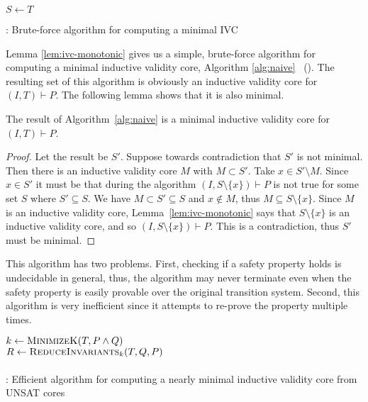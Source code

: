 

\begin{algorithm}[t]
  \BlankLine
  $S \leftarrow T$ \\
   {
  }
\caption{\bfalg: Brute-force algorithm for computing a minimal IVC}
\label{alg:naive}
\end{algorithm}

Lemma \ref{lem:ivc-monotonic} gives us a simple, brute-force algorithm for computing
a minimal inductive validity core, Algorithm \ref{alg:naive} ~(\bfalg). The
resulting set of this algorithm is obviously an inductive validity
core for $(I, T)\vdash P$. The following lemma shows that it is also
minimal.

\begin{lemma}
  The result of Algorithm~\ref{alg:naive} is a minimal inductive validity core
  for $(I, T)\vdash P$.
\end{lemma}
\begin{proof}
  Let the result be $S'$. Suppose towards contradiction that $S'$ is not
  minimal. Then there is an inductive validity core $M$ with $M
  \subset S'$. Take $x \in S'\setminus M$. Since $x \in S'$ it must be
  that during the algorithm $(I, S\setminus\{x\})\vdash P$ is not true
  for some set $S$ where $S' \subseteq S$. We have $M \subset S'
  \subseteq S$ and $x\not\in M$, thus $M \subseteq S\setminus \{x\}$.
  Since $M$ is an inductive validity core,
  Lemma~\ref{lem:ivc-monotonic} says that $S\setminus \{x\}$ is an
  inductive validity core, and so $(I, S\setminus\{x\})\vdash P$. This
  is a contradiction, thus $S'$ must be minimal.
\end{proof}

This algorithm has two problems. First, checking if a safety property
holds is undecidable in general, thus, the algorithm may never terminate
even when the safety property is easily provable over the original
transition system. Second, this algorithm is very inefficient since it
attempts to re-prove the property multiple times.

\begin{algorithm}[t]
  \BlankLine
  $k \leftarrow \textsc{MinimizeK}(T, P \land Q)$ \\
  $R \leftarrow \textsc{ReduceInvariants}_k(T, Q, P)$ \\
  \\
\caption{\ucalg: Efficient algorithm for computing a nearly minimal inductive validity core from UNSAT cores}
\label{alg:ivc}
\end{algorithm}

